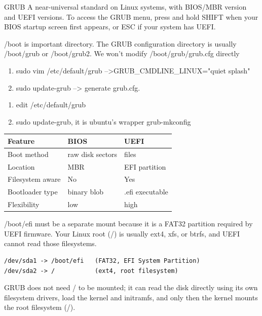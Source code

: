 \documentclass[paper=8.5in:11in, twoside, 12pt, pagesize=pdftex]{book}
\begin{document}
	\par GRUB A near-universal standard on Linux systems, with BIOS/MBR version and UEFI versions. To access the GRUB menu, press and hold SHIFT when your BIOS startup screen first appears, or ESC if your system has UEFI.

	\par /boot is important directory. The GRUB configuration directory is usually /boot/grub or /boot/grub2. We won’t modify /boot/grub/grub.cfg directly
\begin{enumerate}
\item sudo vim /etc/default/grub -->GRUB\_CMDLINE\_LINUX="quiet splash"
\item sudo update-grub  --> generate grub.cfg. 
\end{enumerate}


\begin{enumerate}
\item edit /etc/default/grub
\item sudo update-grub, it is ubuntu's wrapper grub-mkconfig
\end{enumerate}

\begin{tabular}{|l|l|l|}
\hline
\textbf{Feature} & \textbf{BIOS} & \textbf{UEFI} \\
\hline
Boot method & raw disk sectors & files \\
\hline
Location & MBR & EFI partition \\
\hline
Filesystem aware & No & Yes \\
\hline
Bootloader type & binary blob & .efi executable \\
\hline
Flexibility & low & high \\
\hline
\end{tabular}

	\par /boot/efi must be a separate mount because it is a FAT32 partition required by UEFI firmware. Your Linux root (/) is usually ext4, xfs, or btrfs, and UEFI cannot read those filesystems.
\begin{lstlisting}
/dev/sda1 -> /boot/efi   (FAT32, EFI System Partition)
/dev/sda2 -> /           (ext4, root filesystem)
\end{lstlisting}

	\par GRUB does not need / to be mounted; it can read the disk directly using its own filesystem drivers, load the kernel and initramfs, and only then the kernel mounts the root filesystem (/).
\end{document}
